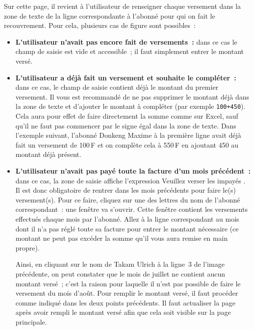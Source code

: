 Sur cette page, il revient à l'utilisateur de renseigner chaque versement dans la zone de texte de la ligne correspondante à l'abonné pour qui on fait le recouvrement. Pour cela, plusieurs cas de figure sont possibles~:

\begin{itemize}
    \item \textbf{L'utilisateur n'avait pas encore fait de versements~:} dans ce cas le champ de saisie est vide et accessible~; il faut simplement entrer le montant versé.

    \item \textbf{L'utilisateur a déjà fait un versement et souhaite le compléter~:} dans ce cas, le champ de saisie contient déjà le montant du premier versement. Il vous est recommandé de ne pas supprimer le montant déjà dans la zone de texte et d'ajouter le montant à compléter (par exemple \texttt{100+450}). Cela aura pour effet de faire directement la somme comme sur Excel, sauf qu'il ne faut pas commencer par le signe égal dans la zone de texte. Dans l'exemple suivant, l'abonné Donkeng Maxime à la première ligne avait déjà fait un versement de 100\,F et on complète cela à 550\,F en ajoutant 450 au montant déjà présent.

    \item \textbf{L'utilisateur n'avait pas payé toute la facture d'un mois précédent~:} dans ce cas, la zone de saisie affiche l'expression \og Veuillez verser les impayés \fg{}. Il est donc obligatoire de rentrer dans les mois précédents pour faire le(s) versement(s). Pour ce faire, cliquez sur une des lettres du nom de l'abonné correspondant~: une fenêtre va s'ouvrir. Cette fenêtre contient les versements effectués chaque mois par l'abonné. Allez à la ligne correspondant au mois dont il n'a pas réglé toute sa facture pour entrer le montant nécessaire (ce montant ne peut pas excéder la somme qu'il vous aura remise en main propre).

    Ainsi, en cliquant sur le nom de Takam Ulrich à la ligne~3 de l'image précédente, on peut constater que le mois de juillet ne contient aucun montant versé~; c'est la raison pour laquelle il n'est pas possible de faire le versement du mois d'août. Pour remplir le montant versé, il faut procéder comme indiqué dans les deux points précédents. Il faut actualiser la page après avoir rempli le montant versé afin que cela soit visible sur la page principale.
\end{itemize}


